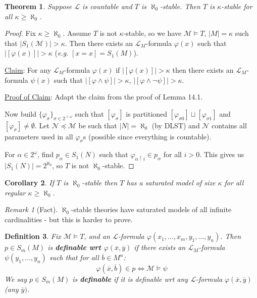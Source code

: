 \documentclass[]{article}
\theoremstyle{custhm}
\newtheorem{theorem}{Theorem}[section]
\theoremstyle{cusdef}
\newtheorem{defin}[theorem]{Definition}
\theoremstyle{custhm}
\theoremstyle{custhm}
\newtheorem{cor}[theorem]{Corollary}
\theoremstyle{custhm}
\theoremstyle{ex}
\theoremstyle{custhm}
\theoremstyle{cusdef}
\theoremstyle{remark}
\newtheorem*{remark*}{Remark}
\theoremstyle{remark}
\newcommand{\undf}[1]{\textit{\textbf{#1}}}
\renewcommand{\L}{\mathcal{L}}
\renewcommand{\it}[1]{\textit{#1}}
\newcommand{\M}{\mathcal{M}}
\renewcommand{\phi}{\varphi}
\renewcommand{\bar}{\overline}
\newcommand{\N}{\mathcal{N}}
\begin{document}
\begin{theorem}
	Suppose $\L$ is countable and $T$ is $\aleph_0$-stable. Then $T$ is $\kappa$-stable for all $\kappa\ge \aleph_0$.
\end{theorem}
\begin{proof}
	Fix $\kappa \ge \aleph_0$. Assume $T$ is not $\kappa$-stable, so we have $\M\models T$, $|M| = \kappa$ such that $|S_1(\M)| > \kappa$. Then there exists an $\L_M$-formula $\phi(x)$ such that $|[\phi(x)]|>\kappa$ (\it{e.g.} $[x=x]=S_1(M)$).

	\underline{Claim}: For any $\L_M$-formula $\phi(x)$ if $|[\phi(x)]| > \kappa$ then there exists an $\L_M$-formula $\psi(x)$ such that $|[\phi \land \psi]| > \kappa$, $|[\phi \land \neg \psi]| > \kappa$.

	\underline{Proof of Claim}: Adapt the claim from the proof of Lemma 14.1.

	Now build $\{\phi_\sigma\}_{\sigma\in 2^{<\omega}}$ such that $[\phi_\sigma]$ is partitioned $[\phi_{\sigma 0}]\sqcup [\phi_{\sigma 1}] $ and $[\phi_\sigma]\ne \emptyset$. Let $\N\preceq \M$ be such that $|N| = \aleph_0$ (by DLST) and $\N$ contains all parameters used in all $\phi_\sigma$s (possible since everything is countable).

	For $\alpha \in 2^\omega$, find $p_\alpha\in S_1(N)$ such that $\phi_{\alpha \upharpoonright i}\in p_\alpha$ for all $i > 0$. This gives us $|S_1(N)| = 2^{\aleph_0}$, so $T$ is not $\aleph_0$-stable.
\end{proof}

\begin{cor}
	If $T$ is $\aleph_0$-stable then $T$ has a saturated model of size $\kappa$ for all regular $\kappa \ge \aleph_0$.
\end{cor}

\begin{remark*}[Fact]
	$\aleph_0$-stable theories have saturated models of all infinite cardinalities - but this is harder to prove.
\end{remark*}

\begin{defin}
	Fix $\M\models T$, and an $\L$-formula $\phi(x_1,\dots,x_m,y_1,\dots,y_n)$. Then $p \in S_m(M)$ is \undf{definable wrt $\phi(\bar{x},\bar{y})$} if there exists an $\L_M$-formula $\psi(y_1,\dots,y_n)$ such that for all $\bar{b}\in M^n$: $$\phi(\bar{x},\bar{b})\in p \iff \M\models \psi$$
	We say $p \in S_m(M)$ is \undf{definable} if it is definable wrt any $\L$-formula $\phi(\bar{x},\bar{y})$ (any $\bar{y})$.
\end{defin}
\end{document}
